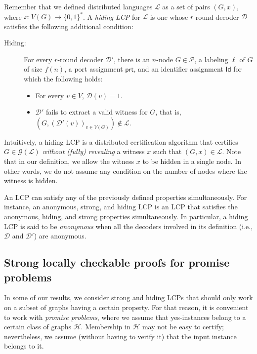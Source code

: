 \documentclass[11pt]{article}
\newcommand*{\ids}{\mathsf{Id}}
\newcommand*{\ports}{\mathsf{prt}}
\begin{document}
Remember that we defined distributed languages $\mathcal{L}$ as a set of pairs
$(G, x)$, where $x: V(G) \rightarrow \{0,1\}^*$. 
A \emph{hiding LCP} for $\mathcal{L}$ is one whose $r$-round decoder
$\mathcal{D}$ satisfies the following additional condition:
\begin{description}
  \item[Hiding:] For every $r$-round decoder $\mathcal{D}'$, there is an $n$-node $G \in
  \mathcal{P}$, a labeling $\ell$ of $G$ of size $f(n)$, a port assignment
  $\ports$, and an identifier assignment $\ids$ for which the following holds:
  \begin{itemize}
    \item For every $v \in V$, $\mathcal{D}(v) = 1$.
    \item $\mathcal{D}'$ fails to extract a valid witness for $G$, that is,
    $(G,(\mathcal{D}'(v))_{v\in V(G)})\notin \mathcal{L}$.
  \end{itemize}
\end{description}

Intuitively, a hiding LCP is a distributed certification algorithm that
certifies $G \in \mathcal{G}(\mathcal{L})$ \emph{without (fully) revealing} a
witness $x$ such that $(G, x) \in \mathcal{L}$. 
Note that in our definition, we allow the witness $x$ to be hidden in a single
node. 
In other words, we do not assume any condition on the number of nodes where the
witness is hidden.

An LCP can satisfy any of the previously defined properties simultaneously. For
instance, an anonymous, strong, and hiding LCP is an LCP that satisfies the
anonymous, hiding, and strong properties simultaneously. 
In particular, a hiding LCP is said to be \emph{anonymous} when all the decoders
involved in its definition (i.e., $\mathcal{D}$ and $\mathcal{D}'$) are
anonymous. 

\subsection{Strong locally checkable proofs for promise problems} 

In some of our results, we consider strong and hiding LCPs that should only work
on a subset of graphs having a certain property.
For that reason, it is convenient to work with \emph{promise problems}, where we
assume that yes-instances belong to a certain class of graphs $\mathcal{H}$.
Membership in $\mathcal{H}$ may not be easy to certify; nevertheless, we assume
(without having to verify it) that the input instance belongs to it.
\end{document}
